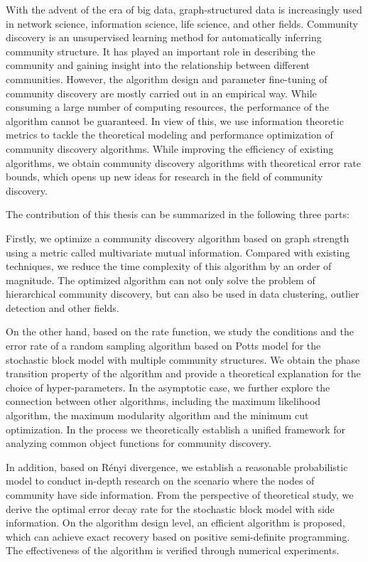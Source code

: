 \begin{abstract*}
  With the advent of the era of big data, graph-structured data is increasingly used in
  network science, information science, life science, and other fields.
  Community discovery is an unsupervised learning method for automatically inferring community structure.
  It has played an important role in describing the community and gaining insight into the relationship between different communities.
  However, the algorithm design and parameter fine-tuning of community discovery are mostly carried out in an empirical way.
  While consuming a large number of computing resources,
  the performance of the algorithm cannot be guaranteed.
  In view of this,
  we use information theoretic metrics to tackle the theoretical modeling and performance optimization of community discovery algorithms.
  While improving the efficiency of existing algorithms, we obtain community discovery algorithms with theoretical error rate bounds,
  which opens up new ideas for research in the field of community discovery.

  The contribution of this thesis can be summarized in the following three parts:

  Firstly, we optimize a community discovery algorithm based on graph strength using a metric called multivariate mutual information.
  Compared with existing techniques, we reduce the time complexity of this algorithm by an order of magnitude.
  The optimized algorithm can not only solve the problem of hierarchical community discovery, but can also be used in data clustering, outlier detection and other fields.

  On the other hand, based on the rate function,
  we study the conditions and the error rate of a random sampling algorithm based on Potts model
  for the stochastic block model with multiple community structures.
  We obtain the phase transition property of the algorithm and provide a theoretical explanation
  for the choice of hyper-parameters.
  In the asymptotic case, we further explore the connection between other algorithms, including the maximum likelihood algorithm, the maximum modularity algorithm and the minimum cut optimization.
  In the process we theoretically establish a unified framework for analyzing common object functions for community discovery.

  In addition, based on Rényi divergence,
  we establish a reasonable probabilistic model
  to conduct in-depth research on the scenario
  where the nodes of community have side information.
  From the perspective of theoretical study,
  we derive the optimal error decay rate for the stochastic block model with side information.
  On the algorithm design level,
  an efficient algorithm is proposed, which can achieve exact recovery based on positive semi-definite programming.
  The effectiveness of the algorithm is verified through numerical experiments.


\end{abstract*}
